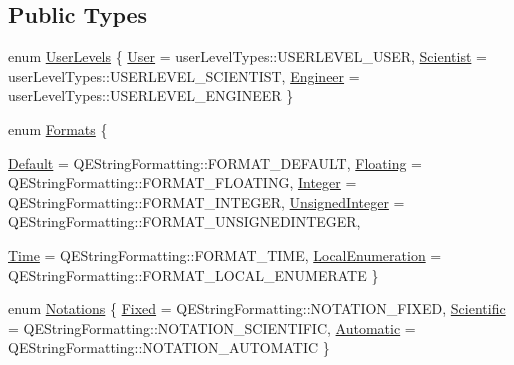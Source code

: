 \subsection*{Public Types}
\begin{DoxyCompactItemize}
\item 
enum \hyperlink{classQEPushButton_a1afc62a8bcda84a0c2ec4c5032547620}{UserLevels} \{ \hyperlink{classQEPushButton_a1afc62a8bcda84a0c2ec4c5032547620a56632ffe023b2c75dfb41f3b1269dd6e}{User} =  userLevelTypes::USERLEVEL\_\-USER, 
\hyperlink{classQEPushButton_a1afc62a8bcda84a0c2ec4c5032547620af726d0eac1cc40dc61d04f282ce99d5a}{Scientist} =  userLevelTypes::USERLEVEL\_\-SCIENTIST, 
\hyperlink{classQEPushButton_a1afc62a8bcda84a0c2ec4c5032547620a42d02d275ed44c49bd91530aafeb28a7}{Engineer} =  userLevelTypes::USERLEVEL\_\-ENGINEER
 \}
\item 
enum \hyperlink{classQEPushButton_a296a60bfbcbb88939a9152e75dd0f3a5}{Formats} \{ \par
\hyperlink{classQEPushButton_a296a60bfbcbb88939a9152e75dd0f3a5adefc3aae5336aacf5da9e2e50e1e93af}{Default} =  QEStringFormatting::FORMAT\_\-DEFAULT, 
\hyperlink{classQEPushButton_a296a60bfbcbb88939a9152e75dd0f3a5a43a7c5259a6a7de12716ad18e6b0500e}{Floating} =  QEStringFormatting::FORMAT\_\-FLOATING, 
\hyperlink{classQEPushButton_a296a60bfbcbb88939a9152e75dd0f3a5a9df7c1b7cd13d414e435198320d03e51}{Integer} =  QEStringFormatting::FORMAT\_\-INTEGER, 
\hyperlink{classQEPushButton_a296a60bfbcbb88939a9152e75dd0f3a5a7eecd8e9603af77f2cfa38cb061bb829}{UnsignedInteger} =  QEStringFormatting::FORMAT\_\-UNSIGNEDINTEGER, 
\par
\hyperlink{classQEPushButton_a296a60bfbcbb88939a9152e75dd0f3a5a2b8fafdc891bfcb1570fa7fae03a1f42}{Time} =  QEStringFormatting::FORMAT\_\-TIME, 
\hyperlink{classQEPushButton_a296a60bfbcbb88939a9152e75dd0f3a5a72e4f9fda3061e16b502f5f9f46d0ed0}{LocalEnumeration} =  QEStringFormatting::FORMAT\_\-LOCAL\_\-ENUMERATE
 \}
\item 
enum \hyperlink{classQEPushButton_a33dca048ed3e75cf2c46baca4befe6f6}{Notations} \{ \hyperlink{classQEPushButton_a33dca048ed3e75cf2c46baca4befe6f6a615391b789b413fa37cf587da4116475}{Fixed} =  QEStringFormatting::NOTATION\_\-FIXED, 
\hyperlink{classQEPushButton_a33dca048ed3e75cf2c46baca4befe6f6a5f81d8fbe3fa7917f9bf12658a578201}{Scientific} =  QEStringFormatting::NOTATION\_\-SCIENTIFIC, 
\hyperlink{classQEPushButton_a33dca048ed3e75cf2c46baca4befe6f6a94086ee2afd806962def5d5c1ab45c20}{Automatic} =  QEStringFormatting::NOTATION\_\-AUTOMATIC
 \}
\item 

\end{DoxyCompactItemize}
